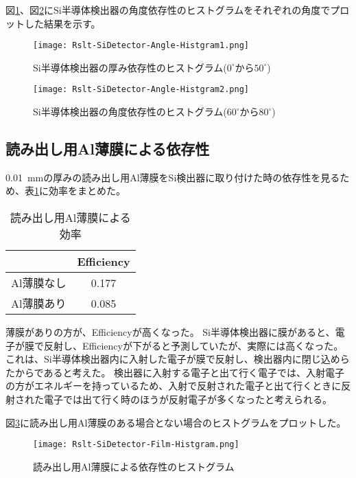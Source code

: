 \documentclass[a4paper,10pt]{jreport}
\begin{document}
図\ref{Rslt-SiDetector-Angle-Histgram1}、図\ref{Rslt-SiDetector-Angle-Histgram2}にSi半導体検出器の角度依存性のヒストグラムをそれぞれの角度でプロットした結果を示す。

\begin{figure}[H]
	\center
	\texttt{[image: Rslt-SiDetector-Angle-Histgram1.png]}
	\caption{Si半導体検出器の厚み依存性のヒストグラム($0^{\circ}$から$50^{\circ}$)} \label{Rslt-SiDetector-Angle-Histgram1}
\end{figure}

\begin{figure}[H]
	\center
	\texttt{[image: Rslt-SiDetector-Angle-Histgram2.png]}
	\caption{Si半導体検出器の角度依存性のヒストグラム($60^{\circ}$から$80^{\circ}$)} \label{Rslt-SiDetector-Angle-Histgram2}
\end{figure}



\subsection{読み出し用Al薄膜による依存性}

\SI{0.01}{mm}の厚みの読み出し用Al薄膜をSi検出器に取り付けた時の依存性を見るため、表\ref{Tab-SiDetector-Film-Efficiency}に効率をまとめた。

\begin{table}[H] 
	\center
	\caption{読み出し用Al薄膜による効率} \label{Tab-SiDetector-Film-Efficiency}
	\begin{tabular}{cc}
		\hline
		 & Efficiency \\
		\hline
		Al薄膜なし & 0.177 \\
		Al薄膜あり & 0.085 \\
		\hline
	\end{tabular}
\end{table}

薄膜がありの方が、Efficiencyが高くなった。
Si半導体検出器に膜があると、電子が膜で反射し、Efficiencyが下がると予測していたが、実際には高くなった。
これは、Si半導体検出器内に入射した電子が膜で反射し、検出器内に閉じ込めらたからであると考えた。
検出器に入射する電子と出て行く電子では、入射電子の方がエネルギーを持っているため、入射で反射された電子と出て行くときに反射された電子では出て行く時のほうが反射電子が多くなったと考えられる。

図\ref{Rslt-SiDetector-Film-Histgram}に読み出し用Al薄膜のある場合とない場合のヒストグラムをプロットした。

\begin{figure}[H]
	\center
	\texttt{[image: Rslt-SiDetector-Film-Histgram.png]}
	\caption{読み出し用Al薄膜による依存性のヒストグラム} \label{Rslt-SiDetector-Film-Histgram}
\end{figure}
\end{document}

